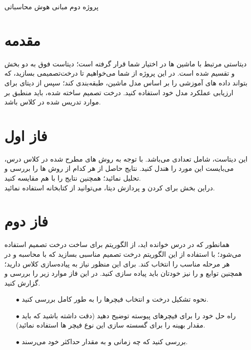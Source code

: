 \documentclass{article}
\begin{document}
	\begin{centering}
		\LARGE
		پروژه دوم مبانی هوش محاسباتی \\
	\end{centering}
	\section*{مقدمه}
	دیتاستی مرتبط با ماشین ها در اختیار شما قرار گرفته است؛ دیتاست فوق به دو بخش  و  تقسیم شده است. در این پروژه از شما می‌خواهیم تا درخت‌تصمیمی بسازید، که بتواند داده های آموزشی را بر اساس مدل ماشین، طبقه‌بندی کند؛ سپس از دیتای  برای ارزیابی عملکرد مدل خود استفاده کنید. درخت تصمیم ساخته شده، باید منطبق بر موارد تدریس شده در کلاس باشد.
	
	\section{فاز اول}
	این دیتاست، شامل تعدادی  می‌باشد. با توجه به روش های مطرح شده در کلاس درس، می‌بایست این مورد را هندل کنید. نتایج حاصل از هر کدام از روش ها را بررسی و تحلیل نمائید؛ همچنین نتایج را با هم مقایسه کنید.
	\\
	دراین بخش برای  کردن و پردازش دیتا، می‌توانید از کتابخانه  استفاده نمائید. 
	
	\section {فاز دوم}
	همانطور که در درس خوانده اید، از الگوریتم  برای ساخت درخت تصمیم استفاده می‌شود؛ با استفاده از این الگوریتم درخت تصمیم مناسبی بسازید که با محاسبه  و  در هر مرحله  مناسب را انتخاب کند. برای این منظور نیاز به پیاده‌سازی کلاس  دارید؛ همچنین توابع   و  را نیز خودتان باید پیاده سازی کنید. در این فاز موارد زیر را بررسی و گزارش کنید.
	\begin{itemize}
		\item [$\bullet$] نحوه تشکیل درخت و انتخاب فیچرها را به طور کامل بررسی کنید.
		\item [$\bullet$] راه حل خود را برای فیچرهای پیوسته توضیح دهید (دقت داشته باشید که باید مقدار بهینه   را برای گسسته سازی این نوع فیچر ها استفاده نمائید).
		
		\item [$\bullet$] بررسی کنید که چه زمانی  و  به مقدار حداکثر خود می‌رسند.
	\end{itemize}
	
\end{document}
